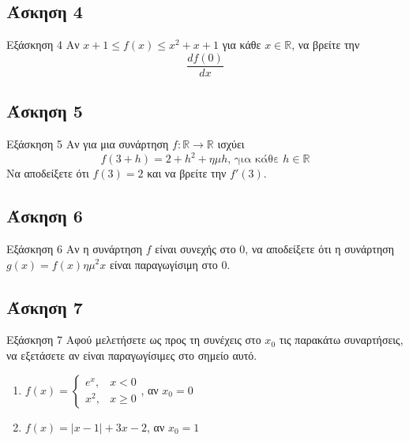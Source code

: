 \documentclass[greek]{beamer}
\begin{document}
\subsection{Άσκηση 4}
\begin{frame}[label=Άσκηση4]{Εξάσκηση 4}
  Αν $x+1\le f(x) \le x^2+x+1$ για κάθε $x\in\mathbb{R}$, να βρείτε την
  $$\frac{df(0)}{dx}$$

\end{frame}

\subsection{Άσκηση 5}
\begin{frame}[label=Άσκηση5]{Εξάσκηση 5}
  Αν για μια συνάρτηση $f:\mathbb{R}\to\mathbb{R}$ ισχύει
  $$f(3+h)=2+h^2+ημh \text{, για κάθε } h\in\mathbb{R}$$
  Να αποδείξετε ότι $f(3)=2$ και να βρείτε την $f'(3)$.

\end{frame}

\subsection{Άσκηση 6}
\begin{frame}[label=Άσκηση6]{Εξάσκηση 6}
  Αν η συνάρτηση $f$ είναι συνεχής στο $0$, να αποδείξετε ότι η συνάρτηση $g(x)=f(x)ημ^2x$ είναι παραγωγίσιμη στο $0$.

\end{frame}

\subsection{Άσκηση 7}
\begin{frame}{Εξάσκηση 7}
  Αφού μελετήσετε ως προς τη συνέχεις στο $x_0$ τις παρακάτω συναρτήσεις, να εξετάσετε αν είναι παραγωγίσιμες στο σημείο αυτό.
  \begin{enumerate}
    \item<1-> $f(x)=\begin{cases}
          e^x, & x<0    \\
          x^2, & x\ge 0
        \end{cases}$, αν $x_0=0$
    \item<2-> $f(x)=|x-1|+3x-2$, αν $x_0=1$
  \end{enumerate}
\end{frame}
\end{document}
